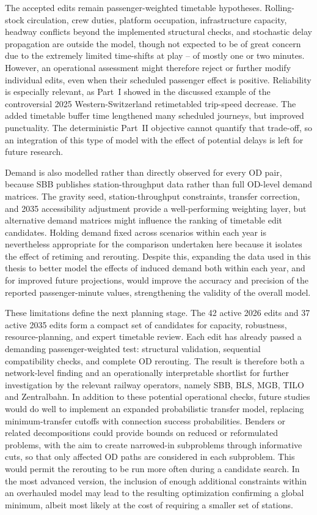 \documentclass[preprint,12pt]{elsarticle}
\begin{document}
The accepted edits remain passenger-weighted timetable hypotheses. Rolling-stock circulation, crew duties, platform occupation, infrastructure capacity, headway conflicts beyond the implemented structural checks, and stochastic delay propagation are outside the model, though not expected to be of great concern due to the extremely limited time-shifts at play -- of mostly one or two minutes. However, an operational assessment might therefore reject or further modify individual edits, even when their scheduled passenger effect is positive. Reliability is especially relevant, as Part~I showed in the discussed example of the controversial 2025 Western-Switzerland retimetabled trip-speed decrease. The added timetable buffer time lengthened many scheduled journeys, but improved punctuality. The deterministic Part~II objective cannot quantify that trade-off, so an integration of this type of model with the effect of potential delays is left for future research.

Demand is also modelled rather than directly observed for every OD pair, because SBB publishes station-throughput data rather than full OD-level demand matrices. The gravity seed, station-throughput constraints, transfer correction, and 2035 accessibility adjustment provide a well-performing weighting layer, but alternative demand matrices might influence the ranking of timetable edit candidates. Holding demand fixed across scenarios within each year is nevertheless appropriate for the comparison undertaken here because it isolates the effect of retiming and rerouting. Despite this, expanding the data used in this thesis to better model the effects of induced demand both within each year, and for improved future projections, would improve the accuracy and precision of the reported passenger-minute values, strengthening the validity of the overall model.

These limitations define the next planning stage. The 42 active 2026 edits and 37 active 2035 edits form a compact set of candidates for capacity, robustness, resource-planning, and expert timetable review. Each edit has already passed a demanding passenger-weighted test: structural validation, sequential compatibility checks, and complete OD rerouting. The result is therefore both a network-level finding and an operationally interpretable shortlist for further investigation by the relevant railway operators, namely SBB, BLS, MGB, TILO and Zentralbahn. In addition to these potential operational checks, future studies would do well to implement an expanded probabilistic transfer model, replacing minimum-transfer cutoffs with connection success probabilities. Benders or related decompositions could provide bounds on reduced or reformulated problems, with the aim to create narrowed-in subproblems through informative cuts, so that only affected OD paths are considered in each subproblem. This would permit the rerouting to be run more often during a candidate search. In the most advanced version, the inclusion of enough additional constraints within an overhauled model may lead to the resulting optimization confirming a global minimum, albeit most likely at the cost of requiring a smaller set of stations.
\end{document}
